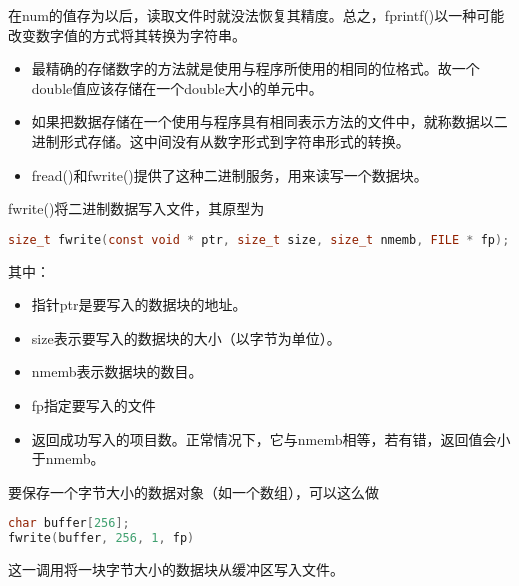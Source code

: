 \begin{frame}[fragile]

  在{\tf num}的值存为{}以后，读取文件时就没法恢复其精度。总之，\textcolor{acolor1}{{\tf fprintf()}以一种可能改变数字值的方式将其转换为字符串。}
\end{frame}

\begin{frame}[fragile]
  \begin{itemize}
  \item 最精确的存储数字的方法就是使用与程序所使用的相同的位格式。故一个double值应该存储在一个double大小的单元中。\\[0.1in]
  \item 如果把数据存储在一个使用与程序具有相同表示方法的文件中，就称数据以二进制形式存储。这中间没有从数字形式到字符串形式的转换。\\[0.1in]
  \item \textcolor{acolor3}{{\tf fread()}和{\tf fwrite()}提供了这种二进制服务，用来读写一个数据块。  }

  \end{itemize}

\end{frame}

\begin{frame}[fragile]
  {\tf fwrite()}将二进制数据写入文件，其原型为
  \begin{lstlisting}[language=c,backgroundcolor=\color{red!20}]
size_t fwrite(const void * ptr, size_t size, size_t nmemb, FILE * fp);
  \end{lstlisting}
  其中：
  \begin{itemize}
  \item 指针{\tf ptr}是要写入的数据块的地址。
  \item {\tf size}表示要写入的数据块的大小（以字节为单位）。
  \item {\tf nmemb}表示数据块的数目。
  \item {\tf fp}指定要写入的文件
  \item 返回成功写入的项目数。正常情况下，它与{\tf nmemb}相等，若有错，返回值会小于{\tf nmemb}。
  \end{itemize}
\end{frame}

\begin{frame}[fragile]
  要保存一个{}字节大小的数据对象（如一个数组），可以这么做
  \begin{lstlisting}[language=c,backgroundcolor=\color{red!20}]
char buffer[256];
fwrite(buffer, 256, 1, fp)
  \end{lstlisting}
  这一调用将一块{}字节大小的数据块从缓冲区写入文件。
\end{frame}

